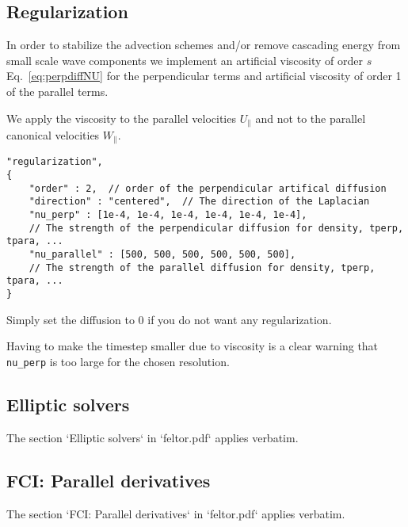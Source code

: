 \subsection{Regularization} \label{sec:regularization}
In order to stabilize the advection schemes and/or remove cascading energy
from small scale wave components
we implement an artificial viscosity of order $s$ Eq.~\eqref{eq:perpdiffNU}
for the perpendicular terms and artificial viscosity of order 1 of the parallel terms.
\begin{tcolorbox}[title=Note]
    We apply the viscosity to the parallel velocities $U_\parallel$ and
    not to the parallel canonical velocities $W_\parallel$.
\end{tcolorbox}
\begin{verbatim}
"regularization",
{
    "order" : 2,  // order of the perpendicular artifical diffusion
    "direction" : "centered",  // The direction of the Laplacian
    "nu_perp" : [1e-4, 1e-4, 1e-4, 1e-4, 1e-4, 1e-4],
    // The strength of the perpendicular diffusion for density, tperp, tpara, ...
    "nu_parallel" : [500, 500, 500, 500, 500, 500],
    // The strength of the parallel diffusion for density, tperp, tpara, ...
}
\end{verbatim}
Simply set the diffusion to 0 if you do not want any regularization.
\begin{tcolorbox}[title=Note]
    Having to make the timestep smaller due to viscosity
    is a clear warning that \texttt{nu_perp} is too large for the
    chosen resolution.
\end{tcolorbox}
\subsection{Elliptic solvers}
The section `Elliptic solvers` in `feltor.pdf` applies verbatim.

\subsection{FCI: Parallel derivatives}
The section `FCI: Parallel derivatives` in `feltor.pdf` applies verbatim.

